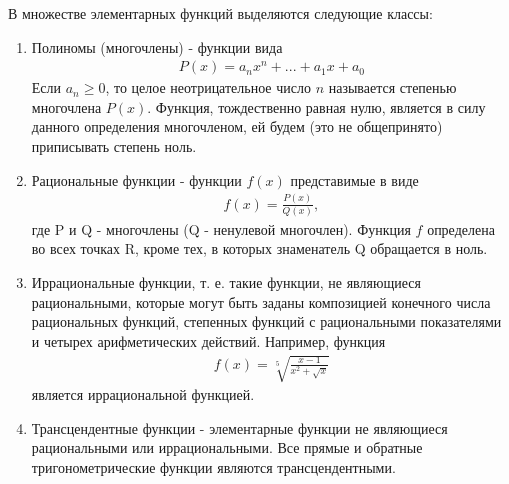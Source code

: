 \documentclass{article}
\begin{document}
В множестве элементарных функций выделяются следующие классы:
\begin{enumerate}
	\item{}Полиномы (многочлены) - функции вида
	\begin{align*}
		P(x) = a_nx^n + . . . + a_1x + a_0
	\end{align*}
	Если $a_n \geq 0$, то целое неотрицательное число $n$ называется степенью многочлена $P(x)$.
	Функция, тождественно равная нулю, является в силу данного определения многочленом, ей будем (это не общепринято) приписывать степень ноль.
	\item{}Рациональные функции - функции $f(x)$ представимые в виде
	\begin{align*}
		f(x) = \frac{P(x)}{Q(x)},
	\end{align*}
	где P и Q - многочлены (Q - ненулевой многочлен).
	Функция $f$ определена
	во всех точках R, кроме тех, в которых знаменатель Q обращается в ноль.
	\item{} Иррациональные функции, т. е. такие функции, не являющиеся рациональными, которые могут быть заданы композицией конечного числа рациональных
	функций, степенных функций с рациональными показателями и четырех арифметических действий. Например, функция
	\begin{align*}
		f(x) = \sqrt[5]{\frac{x-1}{x^2+\sqrt{x}}}
	\end{align*}
	является иррациональной функцией.
	\item{}Трансцендентные функции - элементарные функции не являющиеся рациональными или иррациональными.
	Все прямые и обратные тригонометрические функции являются трансцендентными.
\end{enumerate}
\end{document}

